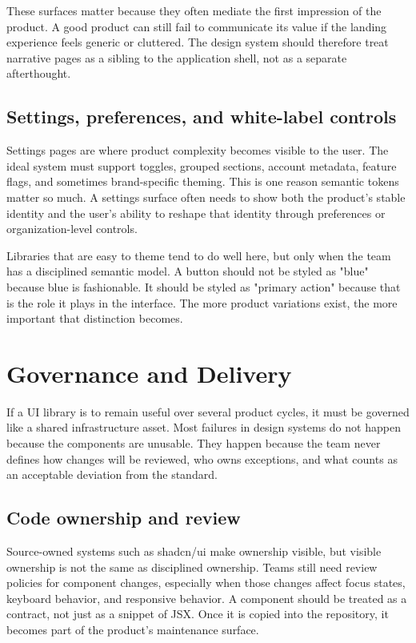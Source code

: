 \documentclass[11pt,twoside,a4paper]{article}
\begin{document}
These surfaces matter because they often mediate the first impression of the product. A good product can still fail to communicate its value if the landing experience feels generic or cluttered. The design system should therefore treat narrative pages as a sibling to the application shell, not as a separate afterthought.

\subsection{Settings, preferences, and white-label controls}
Settings pages are where product complexity becomes visible to the user. The ideal system must support toggles, grouped sections, account metadata, feature flags, and sometimes brand-specific theming. This is one reason semantic tokens matter so much. A settings surface often needs to show both the product's stable identity and the user's ability to reshape that identity through preferences or organization-level controls.

Libraries that are easy to theme tend to do well here, but only when the team has a disciplined semantic model. A button should not be styled as "blue" because blue is fashionable. It should be styled as "primary action" because that is the role it plays in the interface. The more product variations exist, the more important that distinction becomes.

\section{Governance and Delivery}
If a UI library is to remain useful over several product cycles, it must be governed like a shared infrastructure asset. Most failures in design systems do not happen because the components are unusable. They happen because the team never defines how changes will be reviewed, who owns exceptions, and what counts as an acceptable deviation from the standard.

\subsection{Code ownership and review}
Source-owned systems such as shadcn/ui make ownership visible, but visible ownership is not the same as disciplined ownership. Teams still need review policies for component changes, especially when those changes affect focus states, keyboard behavior, and responsive behavior. A component should be treated as a contract, not just as a snippet of JSX. Once it is copied into the repository, it becomes part of the product's maintenance surface.
\end{document}
